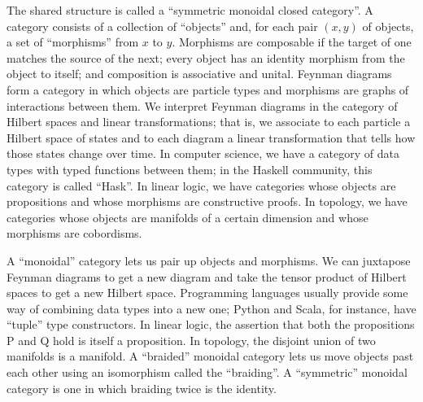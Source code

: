 \documentclass[12pt,twoside,openright]{report}
\begin{document}
The shared structure is called a ``symmetric monoidal closed category''.  A category consists of a collection of ``objects'' and, for each pair $(x, y)$ of objects, a set of ``morphisms'' from $x$ to $y$.  Morphisms are composable if the target of one matches the source of the next; every object has an identity morphism from the object to itself; and composition is associative and unital.  Feynman diagrams form a category in which objects are particle types and morphisms are graphs of interactions between them.  We interpret Feynman diagrams in the category of Hilbert spaces and linear transformations; that is, we associate to each particle a Hilbert space of states and to each diagram a linear transformation that tells how those states change over time.  In computer science, we have a category of data types with typed functions between them; in the Haskell community, this category is called ``Hask''.  In linear logic, we have categories whose objects are propositions and whose morphisms are constructive proofs.  In topology, we have categories whose objects are manifolds of a certain dimension and whose morphisms are cobordisms.

A ``monoidal'' category lets us pair up objects and morphisms.  We can juxtapose Feynman diagrams to get a new diagram and take the tensor product of Hilbert spaces to get a new Hilbert space.  Programming languages usually provide some way of combining data types into a new one; Python and Scala, for instance, have ``tuple'' type constructors.  In linear logic, the assertion that both the propositions P and Q hold is itself a proposition.  In topology, the disjoint union of two manifolds is a manifold.  A ``braided'' monoidal category lets us move objects past each other using an isomorphism called the ``braiding''.  A ``symmetric'' monoidal category is one in which braiding twice is the identity.
\end{document}
